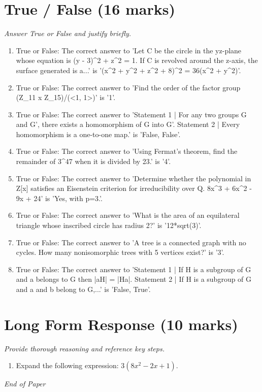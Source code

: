 \documentclass[12pt]{article}
\begin{document}
\section*{True / False (16 marks)}
\textit{Answer True or False and justify briefly.}
\begin{enumerate}[label=\arabic*.]
\item True or False: The correct answer to 'Let C be the circle in the yz-plane whose equation is (y - 3)\^{}2 + z\^{}2 = 1. If C is revolved around the z-axis, the surface generated is a...' is '(x\^{}2 + y\^{}2 + z\^{}2 + 8)\^{}2 = 36(x\^{}2 + y\^{}2)'.
\item True or False: The correct answer to 'Find the order of the factor group (Z\_11 x Z\_15)/(\textless{}1, 1\textgreater{})' is '1'.
\item True or False: The correct answer to 'Statement 1 | For any two groups G and G', there exists a homomorphism of G into G'. Statement 2 | Every homomorphism is a one-to-one map.' is 'False, False'.
\item True or False: The correct answer to 'Using Fermat's theorem, find the remainder of 3\^{}47 when it is divided by 23.' is '4'.
\item True or False: The correct answer to 'Determine whether the polynomial in Z[x] satisfies an Eisenstein criterion for irreducibility over Q. 8x\^{}3 + 6x\^{}2 - 9x + 24' is 'Yes, with p=3.'.
\item True or False: The correct answer to 'What is the area of an equilateral triangle whose inscribed circle has radius 2?' is '12*sqrt(3)'.
\item True or False: The correct answer to 'A tree is a connected graph with no cycles. How many nonisomorphic trees with 5 vertices exist?' is '3'.
\item True or False: The correct answer to 'Statement 1 | If H is a subgroup of G and a belongs to G then |aH| = |Ha|. Statement 2 | If H is a subgroup of G and a and b belong to G,...' is 'False, True'.
\end{enumerate}

\section*{Long Form Response (10 marks)}
\textit{Provide thorough reasoning and reference key steps.}
\begin{enumerate}[label=\arabic*.]
\item Expand the following expression: $3(8x^2-2x+1)$.
\end{enumerate}

\vfill
\noindent\textit{End of Paper}
\end{document}
